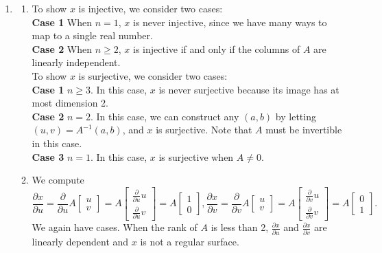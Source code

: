 \documentclass[12pt]{article}
\newcommand{\pderiv}[2][]{\frac{\partial#1}{\partial#2}}
\begin{document}
\begin{enumerate}[label=\Alph*., leftmargin=*]
\item \begin{enumerate}[label=.\Alph*] 
    \item To show $x$ is injective, we consider two cases:\\
          \textbf{Case 1} When $n=1$, $x$ is never injective, since we have many ways to map to a single real number.\\
          \textbf{Case 2} When $n\geq 2$, $x$ is injective if and only if the columns of $A$ are linearly independent.\\
          To show $x$ is surjective, we consider two cases:\\
          \textbf{Case 1} $n\geq 3$. In this case, $x$ is never surjective because its image has at most dimension 2.\\
          \textbf{Case 2} $n=2$. In this case, we can construct any $(a,b)$ by letting $(u,v)=A^{-1}(a,b)$, and $x$ is surjective. Note that $A$ must be invertible in this case.\\
          \textbf{Case 3} $n=1$. In this case, $x$ is surjective when $A\neq0$.
\item We compute\begin{equation*}
    \pderiv[x]{u}=\pderiv{u}A\begin{bmatrix}
        u\\v
    \end{bmatrix}=A\begin{bmatrix}
        \pderiv{u}u\\
        \pderiv{u}v
    \end{bmatrix}=A\begin{bmatrix}
        1\\0
    \end{bmatrix},
    \pderiv[x]{v}=\pderiv{v}A\begin{bmatrix}
        u\\v\end{bmatrix}=A\begin{bmatrix}
        \pderiv{v}u\\
        \pderiv{v}v
    \end{bmatrix}=A\begin{bmatrix}
        0\\1
    \end{bmatrix}.
\end{equation*}
We again have cases. When the rank of $A$ is less than 2, $\pderiv[x]{u}$ and $\pderiv[x]{v}$ are linearly dependent and $x$ is not a regular surface.

\end{enumerate}
\end{enumerate}
\end{document}
